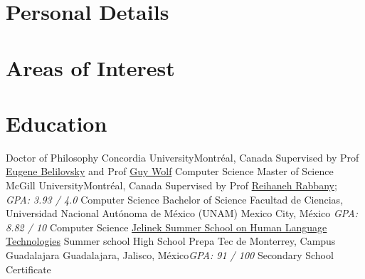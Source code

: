 \documentclass[8pt,a4paper,sans]{moderncv} %
\begin{document}
\makecvtitle %

\section{Personal Details}

\section{Areas of Interest}


\section{Education}

        {Doctor of Philosophy}
        {Concordia University}{Montréal, Canada}
        {Supervised by Prof \href{http://eugenium.github.io/}{Eugene Belilovsky} 
        and Prof \href{http://guywolf.org/}{Guy Wolf}}
        {Computer Science}
        {Master of Science}
        {McGill University}{Montréal, Canada}
        {Supervised by Prof \href{http://www.reirab.com}{Reihaneh Rabbany};
        \textit{GPA: 3.93 / 4.0}}
        {Computer Science}
        {Bachelor of Science}
        {Facultad de Ciencias, Universidad Nacional Autónoma de México (UNAM)}
        {Mexico City, México}
        {\textit{GPA: 8.82 / 10}}
        {Computer Science}
        {\href{https://www2.ee.washington.edu/news/2015JelinekWorkshopSummerSchool.html}{Jelinek Summer School on Human Language Technologies}}
        {Summer school}
        {}{}{}
        {High School}
        {Prepa Tec de Monterrey, Campus Guadalajara}
        {Guadalajara, Jalisco, México}{\textit{GPA: 91 / 100}}
        {Secondary School Certificate}
\end{document}
